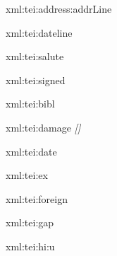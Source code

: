 \startxmlsetups xml:tei:address:addrLine
	\par\blank[small]
\stopxmlsetups

\startxmlsetups xml:tei:dateline
	\par\blank[small]
\stopxmlsetups

\startxmlsetups xml:tei:salute
	\par{}
\stopxmlsetups

\startxmlsetups xml:tei:signed
	\par{}
\stopxmlsetups


\startxmlsetups xml:tei:bibl
\stopxmlsetups

\startxmlsetups xml:tei:damage
	\bgroup\it [\space]\egroup
\stopxmlsetups

\startxmlsetups xml:tei:date
\stopxmlsetups

\startxmlsetups xml:tei:ex
	\bgroup\it\ignorespaces{}\removeunwantedspaces\egroup
\stopxmlsetups

\startxmlsetups xml:tei:foreign
		{%
		{}
		}
		{%
		}
\stopxmlsetups

\startxmlsetups xml:tei:gap
	\FSBlfloor\ \FSBrceil
\stopxmlsetups

\startxmlsetups xml:tei:hi:u
\stopxmlsetups

